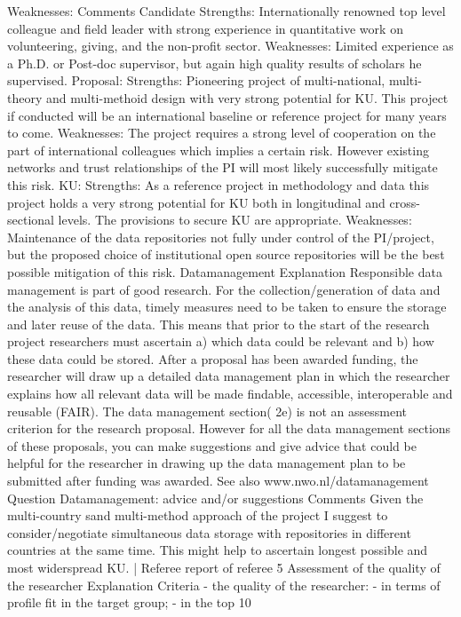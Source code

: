 \documentclass[twocolumn, serif, rga, numeric]{jote-article}
\begin{document}
Weaknesses:
Comments
Candidate
Strengths: Internationally renowned top level colleague and field leader with strong experience in quantitative work on volunteering, giving, and the non-profit sector.
Weaknesses: Limited experience as a Ph.D. or Post-doc supervisor, but again high quality results of scholars he supervised.
Proposal:
Strengths: Pioneering project of multi-national, multi-theory and multi-methoid design with very strong potential for KU.
This project if conducted will be an international baseline or reference project for many years to come.
Weaknesses: The project requires a strong level of cooperation on the part of international colleagues which implies a certain risk. However existing networks and trust relationships of the PI will most likely successfully mitigate this risk.
KU:
Strengths: As a reference project in methodology and data this project holds a very strong potential for KU both in longitudinal and cross-sectional levels. The provisions to secure KU are appropriate.
Weaknesses: Maintenance of the data repositories not fully under control of the PI/project, but the proposed choice of institutional open source repositories will be the best possible mitigation of this risk.
Datamanagement
Explanation
Responsible data management is part of good research. For the collection/generation of data and the analysis of this data, timely measures need to be taken to ensure the storage and later reuse of the data. This means that prior to the start of the research project researchers must ascertain a) which data could be relevant and b) how these data could be stored. After a proposal has been awarded funding, the researcher will draw up a detailed data management plan in which the researcher explains how all relevant data will be made findable, accessible, interoperable and reusable (FAIR). The data management section( 2e) is not an assessment criterion for the research proposal. However for all the data management sections of these proposals, you can make suggestions and give advice that could be helpful for the researcher in drawing up the data management plan to be submitted after funding was awarded. See also www.nwo.nl/datamanagement
Question
Datamanagement: advice and/or suggestions
Comments
Given the multi-country sand multi-method approach of the project I suggest to consider/negotiate simultaneous data storage with repositories in different countries at the same time. This might help to ascertain longest possible and most widerspread KU.
|  Referee report of referee 5
Assessment of the quality of the researcher
Explanation
Criteria - the quality of the researcher: - in terms of profile fit in the target group; - in the top 10%
\end{document}

